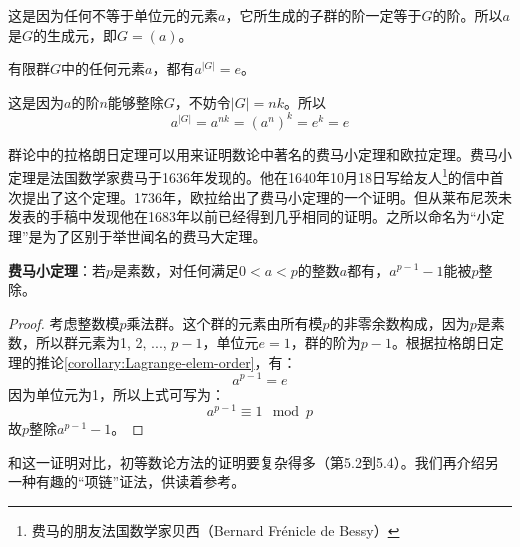 \documentclass{article}
\begin{document}
这是因为任何不等于单位元的元素$a$，它所生成的子群的阶一定等于$G$的阶。所以$a$是$G$的生成元，即$G = (a)$。

\begin{corollary}
有限群$G$中的任何元素$a$，都有$a^{|G|} = e$。
\label{corollary:Lagrange-elem-order}
\end{corollary}

这是因为$a$的阶$n$能够整除$G$，不妨令$|G| = nk$。所以
\[
a^{|G|} = a^{nk} = (a^n)^k = e^k = e
\]

群论中的拉格朗日定理可以用来证明数论中著名的费马小定理和欧拉定理。费马小定理是法国数学家费马于1636年发现的。他在1640年10月18日写给友人\footnote{费马的朋友法国数学家贝西（Bernard Frénicle de Bessy）}的信中首次提出了这个定理。1736年，欧拉给出了费马小定理的一个证明。但从莱布尼茨未发表的手稿中发现他在1683年以前已经得到几乎相同的证明。之所以命名为“小定理”是为了区别于举世闻名的费马大定理。

\begin{theorem}
\textbf{费马小定理}：若$p$是素数，对任何满足$0 < a < p$的整数$a$都有，$a^{p-1}-1$能被$p$整除。
\end{theorem}

\begin{proof}
考虑整数模$p$乘法群。这个群的元素由所有模$p$的非零余数构成，因为$p$是素数，所以群元素为1, 2, ..., $p-1$，单位元$e = 1$，群的阶为$p-1$。根据拉格朗日定理的推论\ref{corollary:Lagrange-elem-order}，有：
\[
a^{p-1} = e
\]
因为单位元为1，所以上式可写为：
\[
a^{p-1} \equiv 1 \mod p
\]
故$p$整除$a^{p-1} - 1$。
\end{proof}

和这一证明对比，初等数论方法的证明要复杂得多（\cite{StepanovRose15}第5.2到5.4）。我们再介绍另一种有趣的“项链”证法\cite{Wiki-FLT-proof}，供读着参考。
\end{document}
